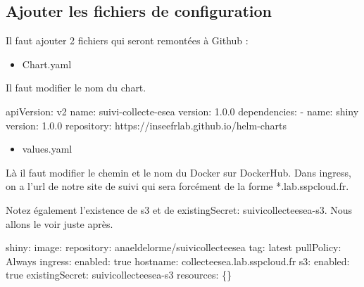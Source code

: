 \documentclass[
  letterpaper,
  DIV=11,
  numbers=noendperiod]{scrreprt}
\newenvironment{Shaded}{\begin{snugshade}}{\end{snugshade}}
\newcommand{\FloatTok}[1]{\textcolor[rgb]{0.68,0.00,0.00}{#1}}
\newcommand{\NormalTok}[1]{\textcolor[rgb]{0.00,0.23,0.31}{#1}}
\newcommand{\OperatorTok}[1]{\textcolor[rgb]{0.37,0.37,0.37}{#1}}
\providecommand{\tightlist}{%
  \setlength{\itemsep}{0pt}\setlength{\parskip}{0pt}}\usepackage{longtable,booktabs,array}
\begin{document}
\hypertarget{ajouter-les-fichiers-de-configuration}{%
\subsection{Ajouter les fichiers de
configuration}\label{ajouter-les-fichiers-de-configuration}}

Il faut ajouter 2 fichiers qui seront remontées à Github :

\begin{itemize}
\tightlist
\item
  Chart.yaml
\end{itemize}

Il faut modifier le nom du chart.

\begin{Shaded}
\begin{Highlighting}[]
\NormalTok{apiVersion: v2}
\NormalTok{name: suivi}\OperatorTok{{-}}\NormalTok{collecte}\OperatorTok{{-}}\NormalTok{esea}
\NormalTok{version: }\FloatTok{1.0.0}
\NormalTok{dependencies:}
  \OperatorTok{{-}}\NormalTok{ name: shiny}
\NormalTok{    version: }\FloatTok{1.0.0}
\NormalTok{    repository: https:}\OperatorTok{//}\NormalTok{inseefrlab.github.io}\OperatorTok{/}\NormalTok{helm}\OperatorTok{{-}}\NormalTok{charts}
\end{Highlighting}
\end{Shaded}

\begin{itemize}
\tightlist
\item
  values.yaml
\end{itemize}

Là il faut modifier le chemin et le nom du Docker sur DockerHub. Dans
ingress, on a l'url de notre site de suivi qui sera forcément de la
forme *.lab.sspcloud.fr.

Notez également l'existence de s3 et de existingSecret:
suivicollecteesea-s3. Nous allons le voir juste après.

\begin{Shaded}
\begin{Highlighting}[]
\NormalTok{shiny:}
\NormalTok{  image:}
\NormalTok{    repository: anaeldelorme}\OperatorTok{/}\NormalTok{suivicollecteesea}
\NormalTok{    tag: latest}
\NormalTok{    pullPolicy: Always}
\NormalTok{  ingress:}
\NormalTok{    enabled: true}
\NormalTok{    hostname: collecteesea.lab.sspcloud.fr}
\NormalTok{  s3:}
\NormalTok{    enabled: true}
\NormalTok{    existingSecret: suivicollecteesea}\OperatorTok{{-}}\NormalTok{s3}
\NormalTok{  resources: \{\}}
\end{Highlighting}
\end{Shaded}
\end{document}
